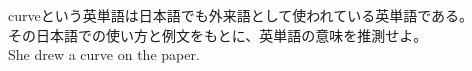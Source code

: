 \documentclass{jarticle}
\begin{document}
\vspace*{\fill}
\begin{center}
curveという英単語は日本語でも外来語として使われている英単語である。\\
その日本語での使い方と例文をもとに、英単語の意味を推測せよ。\\
She drew a curve on the paper.
\end{center}
\vspace*{\fill}
\end{document}
